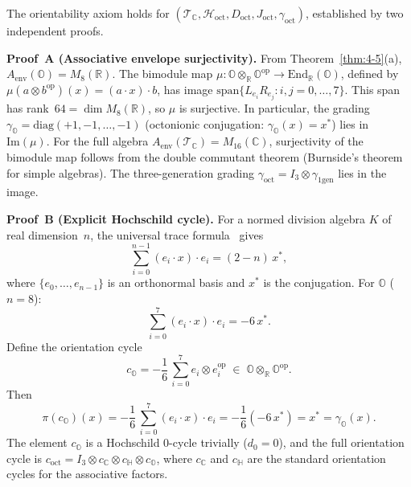 \begin{theorem}\label{thm:4-6}
The orientability axiom holds for $(\mathcal{T}_{\mathbb{C}}, \mathcal{H}_{\mathrm{oct}}, D_{\mathrm{oct}}, J_{\mathrm{oct}}, \gamma_{\mathrm{oct}})$, established by two independent proofs.

\textbf{Proof~A (Associative envelope surjectivity).}
From Theorem~\ref{thm:4-5}(a), $A_{\mathrm{env}}(\mathbb{O}) = M_8(\mathbb{R})$. The bimodule map $\mu\colon \mathbb{O} \otimes_{\mathbb{R}} \mathbb{O}^{\mathrm{op}} \to \mathrm{End}_{\mathbb{R}}(\mathbb{O})$, defined by $\mu(a \otimes b^{\mathrm{op}})(x) = (a \cdot x) \cdot b$, has image $\mathrm{span}\{L_{e_i} R_{e_j} : i, j = 0, \ldots, 7\}$. This span has rank~$64 = \dim M_8(\mathbb{R})$, so $\mu$ is surjective. In particular, the grading $\gamma_{\mathbb{O}} = \mathrm{diag}(+1, -1, \ldots, -1)$ (octonionic conjugation: $\gamma_{\mathbb{O}}(x) = x^*$) lies in $\mathrm{Im}(\mu)$. For the full algebra $A_{\mathrm{env}}(\mathcal{T}_{\mathbb{C}}) = M_{16}(\mathbb{C})$, surjectivity of the bimodule map follows from the double commutant theorem (Burnside's theorem for simple algebras). The three-generation grading $\gamma_{\mathrm{oct}} = I_3 \otimes \gamma_{1\mathrm{gen}}$ lies in the image.

\textbf{Proof~B (Explicit Hochschild cycle).}
For a normed division algebra $K$ of real dimension~$n$, the universal trace formula~\cite{ch4:Baez2002} gives
\begin{equation}
  \sum_{i=0}^{n-1} (e_i \cdot x) \cdot e_i = (2 - n)\, x^*,
  \label{eq:4-84}
\end{equation}
where $\{e_0, \ldots, e_{n-1}\}$ is an orthonormal basis and $x^*$ is the conjugation. For $\mathbb{O}$ ($n = 8$):
\begin{equation}
  \sum_{i=0}^{7} (e_i \cdot x) \cdot e_i = -6\, x^*.
  \label{eq:4-85}
\end{equation}
Define the orientation cycle
\begin{equation}
  c_{\mathbb{O}} = -\frac{1}{6}\, \sum_{i=0}^{7} e_i \otimes e_i^{\mathrm{op}} \;\in\; \mathbb{O} \otimes_{\mathbb{R}} \mathbb{O}^{\mathrm{op}}.
  \label{eq:4-86}
\end{equation}
Then
\begin{equation}
  \pi(c_{\mathbb{O}})(x) = -\frac{1}{6}\, \sum_{i=0}^{7} (e_i \cdot x) \cdot e_i = -\frac{1}{6}(-6\, x^*) = x^* = \gamma_{\mathbb{O}}(x).
  \label{eq:4-87}
\end{equation}
The element $c_{\mathbb{O}}$ is a Hochschild 0-cycle trivially ($d_0 = 0$), and the full orientation cycle is $c_{\mathrm{oct}} = I_3 \otimes c_{\mathbb{C}} \otimes c_{\mathbb{H}} \otimes c_{\mathbb{O}}$, where $c_{\mathbb{C}}$ and $c_{\mathbb{H}}$ are the standard orientation cycles for the associative factors.
\end{theorem}

